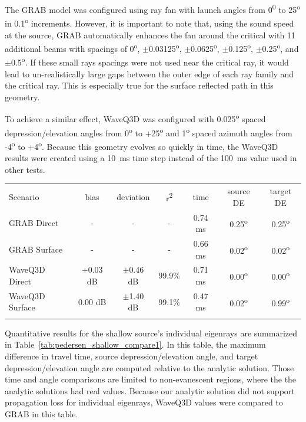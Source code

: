 \documentclass{ws-jca}
\begin{document}
The GRAB model was configured using ray fan with launch angles from
0\textsuperscript{0} to 25\textsuperscript{o} in 0.1\textsuperscript{o}
increments. However, it is important to note that, using the sound speed at
the source, GRAB automatically enhances the fan around the critical with 11
additional beams with spacings of 0\textsuperscript{o},
\(\pm\)0.03125\textsuperscript{o}, \(\pm\)0.0625\textsuperscript{o},
\(\pm\)0.125\textsuperscript{o}, \(\pm\)0.25\textsuperscript{o}, and
\(\pm\)0.5\textsuperscript{o}. If these small rays spacings were not used
near the critical ray, it would lead to un-realistically large gaps between
the outer edge of each ray family and the critical ray. This is especially
true for the surface reflected path in this geometry.

To achieve a similar effect, WaveQ3D was configured with
0.025\textsuperscript{o} spaced depression/elevation angles from
0\textsuperscript{o} to +25\textsuperscript{o} and 1\textsuperscript{o} spaced
azimuth angles from -4\textsuperscript{o} to +4\textsuperscript{o}. Because
this geometry evolves so quickly in time, the WaveQ3D results were created
using a 10~ms time step instead of the 100~ms value used in other tests. 

\begin{table}[th]
	{\begin{tabular}{@{}lcccccc@{}} \toprule
		Scenario & bias & deviation & r\textsuperscript{2} 
			& time & source DE & target DE \\ \colrule
		GRAB Direct & - & - & - 
			& 0.74 ms & 0.25\textsuperscript{o} & 0.25\textsuperscript{o} \\
		GRAB Surface & - & - & - 
			& 0.66 ms & 0.02\textsuperscript{o} & 0.02\textsuperscript{o} \\
		WaveQ3D Direct & +0.03 dB & \(\pm\)0.46 dB & 99.9\% 
			& 0.71 ms & 0.00\textsuperscript{o} & 0.00\textsuperscript{o} \\
		WaveQ3D Surface & 0.00 dB & \(\pm\)1.40 dB & 99.1\% 
			& 0.47 ms & 0.02\textsuperscript{o} & 0.99\textsuperscript{o} \\
			\botrule
	\end{tabular}}
\end{table}
Quantitative results for the shallow source's individual eigenrays are
summarized in Table~\ref{tab:pedersen_shallow_compare1}. In this table, the
maximum difference in travel time, source depression/elevation angle, and
target depression/elevation angle are computed relative to the analytic
solution. Those time and angle comparisons are limited to non-evanescent
regions, where the the analytic solutions had real values. Because our
analytic solution did not support propagation loss for individual
eigenrays, WaveQ3D values were compared to GRAB in this table.
\end{document}
